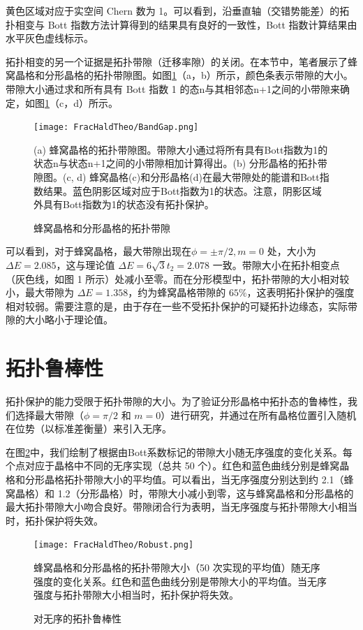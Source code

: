 黄色区域对应于实空间 Chern 数为 1。可以看到，沿垂直轴（交错势能差）的拓扑相变与 Bott 指数方法计算得到的结果具有良好的一致性，Bott 指数计算结果由水平灰色虚线标示。

拓扑相变的另一个证据是拓扑带隙（迁移率隙）的关闭。在本节中，笔者展示了蜂窝晶格和分形晶格的拓扑带隙图。如图\ref{fig:BandGap}（a，b）所示，颜色条表示带隙的大小。带隙大小通过求和所有具有 Bott 指数 1 的态n与其相邻态n+1之间的小带隙来确定，如图\ref{fig:BandGap}（c，d）所示。

\begin{figure}[htbp]
    \centering
    \texttt{[image: FracHaldTheo/BandGap.png]}
    \caption{蜂窝晶格和分形晶格的拓扑带隙}(a) 蜂窝晶格的拓扑带隙图。带隙大小通过将所有具有Bott指数为1的状态n与状态n+1之间的小带隙相加计算得出。(b) 分形晶格的拓扑带隙图。(c, d) 蜂窝晶格(c)和分形晶格(d)在最大带隙处的能谱和Bott指数结果。蓝色阴影区域对应于Bott指数为1的状态。注意，阴影区域外具有Bott指数为1的状态没有拓扑保护。
    \label{fig:BandGap}
\end{figure}

可以看到，对于蜂窝晶格，最大带隙出现在$\phi=±π/2, m=0$ 处，大小为 $\Delta E=2.085$，这与理论值 $\Delta E=6\sqrt{3}t_2=2.078$ 一致。带隙大小在拓扑相变点（灰色线，如图 1 所示）处减小至零。而在分形模型中，拓扑带隙的大小相对较小，最大带隙为 $\Delta E=1.358$，约为蜂窝晶格带隙的 $65\%$，这表明拓扑保护的强度相对较弱。需要注意的是，由于存在一些不受拓扑保护的可疑拓扑边缘态，实际带隙的大小略小于理论值。

\section{拓扑鲁棒性}

拓扑保护的能力受限于拓扑带隙的大小。为了验证分形晶格中拓扑态的鲁棒性，我们选择最大带隙（$\phi = \pi/2$ 和 $m = 0$）进行研究，并通过在所有晶格位置引入随机在位势（以标准差衡量）来引入无序。

在图\ref{fig:Robust}中，我们绘制了根据由Bott系数标记的带隙大小随无序强度的变化关系。每个点对应于晶格中不同的无序实现（总共 50 个）。红色和蓝色曲线分别是蜂窝晶格和分形晶格拓扑带隙大小的平均值。可以看出，当无序强度分别达到约 2.1（蜂窝晶格）和 1.2（分形晶格）时，带隙大小减小到零，这与蜂窝晶格和分形晶格的最大拓扑带隙大小吻合良好。带隙闭合行为表明，当无序强度与拓扑带隙大小相当时，拓扑保护将失效。

\begin{figure}[htbp]
    \centering
    \texttt{[image: FracHaldTheo/Robust.png]}
    \caption{对无序的拓扑鲁棒性}蜂窝晶格和分形晶格的拓扑带隙大小（50 次实现的平均值）随无序强度的变化关系。红色和蓝色曲线分别是带隙大小的平均值。当无序强度与拓扑带隙大小相当时，拓扑保护将失效。
    \label{fig:Robust}
\end{figure}

